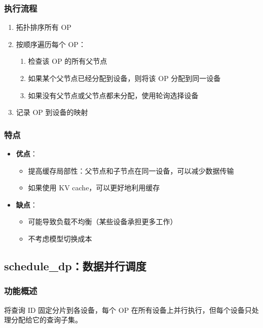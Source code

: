 \documentclass[12pt,a4paper]{article}
\begin{document}
\subsubsection{执行流程}

\begin{enumerate}
    \item 拓扑排序所有 OP
    \item 按顺序遍历每个 OP：
    \begin{enumerate}
        \item 检查该 OP 的所有父节点
        \item 如果某个父节点已经分配到设备，则将该 OP 分配到同一设备
        \item 如果没有父节点或父节点都未分配，使用轮询选择设备
    \end{enumerate}
    \item 记录 OP 到设备的映射
\end{enumerate}

\subsubsection{特点}

\begin{itemize}
    \item \textbf{优点}：
    \begin{itemize}
        \item 提高缓存局部性：父节点和子节点在同一设备，可以减少数据传输
        \item 如果使用 KV cache，可以更好地利用缓存
    \end{itemize}
    \item \textbf{缺点}：
    \begin{itemize}
        \item 可能导致负载不均衡（某些设备承担更多工作）
        \item 不考虑模型切换成本
    \end{itemize}
\end{itemize}

\subsection{schedule\_dp：数据并行调度}

\subsubsection{功能概述}

将查询 ID 固定分片到各设备，每个 OP 在所有设备上并行执行，但每个设备只处理分配给它的查询子集。
\end{document}
